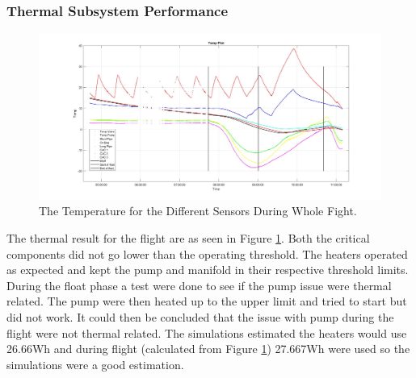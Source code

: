 \subsubsection{Thermal Subsystem Performance}
\begin{figure}[H]
    \centering
    \includegraphics[width=\linewidth]{4-experiment-design/img/Termal_flight_true.jpg}
    \caption{The Temperature for the Different Sensors During Whole Fight.}
    \label{fig:Termal_flight_true}
\end{figure}
The thermal result for the flight are as seen in Figure \ref{fig:Termal_flight_true}. Both the critical components did not go lower than the operating threshold. The heaters operated as expected and kept the pump and manifold in their respective threshold limits. During the float phase a test were done to see if the pump issue were thermal related. The pump were then heated up to the upper limit and tried to start but did not work. It could then be concluded that the issue with pump during the flight were not thermal related. The simulations estimated the heaters would use 26.66Wh and during flight (calculated from Figure \ref{fig:Termal_flight_true}) 27.667Wh were used so the simulations were a good estimation.



